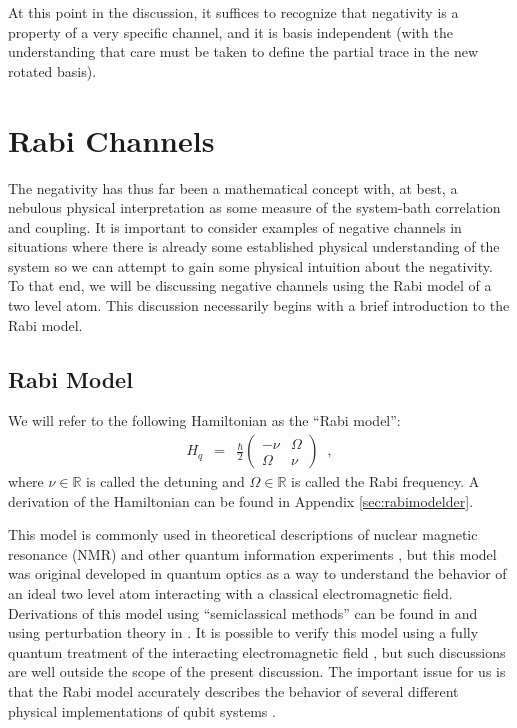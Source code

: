 At this point in the discussion, it suffices to recognize that negativity is a property of a very specific channel, and it is basis independent (with the understanding that care must be taken to define the partial trace in the new rotated basis).

\chapter{Rabi Channels}
\label{sec:rabi}

The negativity has thus far been a mathematical concept with, at best, a nebulous physical interpretation as some measure of the system-bath correlation and coupling.  It is important to consider examples of negative channels in situations where there is already some established physical understanding of the system so we can attempt to gain some physical intuition about the negativity.  To that end, we will be discussing negative channels using the Rabi model of a two level atom.  This discussion necessarily begins with a brief introduction to the Rabi model.

\section{Rabi Model}

We will refer to the following Hamiltonian as the ``Rabi model'':
\begin{eqnarray*}
H_q &=& \frac{\hbar}{2}\begin{pmatrix}
-\nu & \Omega\\
\Omega & \nu
\end{pmatrix}\;\;,
\end{eqnarray*}
where $\nu\in\mathbb{R}$ is called the detuning and $\Omega\in\mathbb{R}$ is called the Rabi frequency.  A derivation of the Hamiltonian can be found in Appendix \ref{sec:rabimodelder}.

This model is commonly used in theoretical descriptions of nuclear magnetic resonance (NMR) and other quantum information experiments \cite{Mikio2008}, but this model was original developed in quantum optics as a way to understand the behavior of an ideal two level atom interacting with a classical electromagnetic field.  Derivations of this model using ``semiclassical methods'' can be found in \cite{Kok2010,Barnett2002,Mandel1995,Loudon2000} and using perturbation theory in \cite{Loudon2000,Orszag2008,Suter1997}.  It is possible to verify this model using a fully quantum treatment of the interacting electromagnetic field \cite{Barnett2002}, but such discussions are well outside the scope of the present discussion.  The important issue for us is that the Rabi model accurately describes the behavior of several different physical implementations of qubit systems \cite{Mikio2008}.

